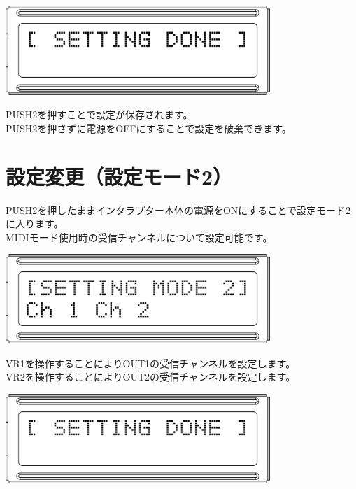 \documentclass[a4paper,11pt]{jsarticle}
\begin{document}
\vspace*{10mm}
\begin{center}
\includegraphics[width=100mm]{image/Arduino_Interrupter_v1_LCD_SET_DONE.png}
\end{center}
\vspace*{10mm}

PUSH2を押すことで設定が保存されます。 \\
PUSH2を押さずに電源をOFFにすることで設定を破棄できます。



\clearpage

\section{設定変更（設定モード2）}

PUSH2を押したままインタラプター本体の電源をONにすることで設定モード2に入ります。 \\
MIDIモード使用時の受信チャンネルについて設定可能です。

\vspace*{10mm}
\begin{center}
\includegraphics[width=100mm]{image/Arduino_Interrupter_v1_LCD_SET_2.png}
\end{center}
\vspace*{10mm}

VR1を操作することによりOUT1の受信チャンネルを設定します。 \\
VR2を操作することによりOUT2の受信チャンネルを設定します。 

\vspace*{10mm}
\begin{center}
\includegraphics[width=100mm]{image/Arduino_Interrupter_v1_LCD_SET_DONE.png}
\end{center}
\vspace*{10mm}
\end{document}
